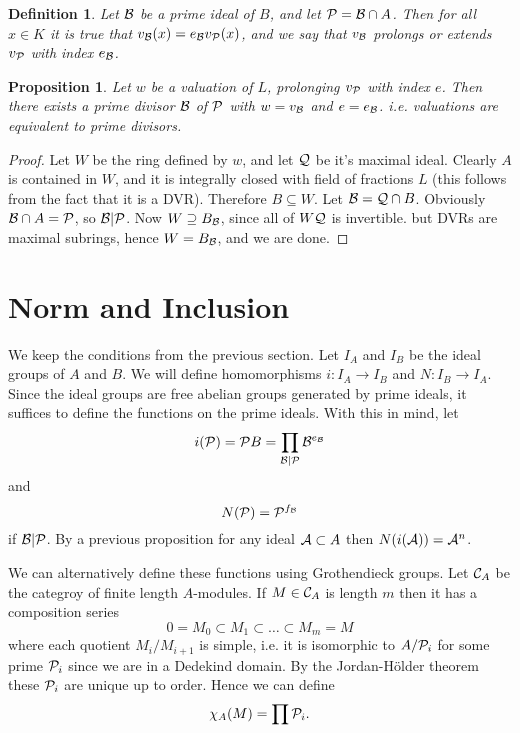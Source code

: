 \documentclass[11pt]{article} %
\newtheorem{defn}{Definition}
\newtheorem{prop}{Proposition}
\theoremstyle{remark}\newtheorem*{rem}{Remark}
\begin{document}
\begin{defn}
 Let ${\cal B}$ be a prime ideal of $B$, and let ${\cal P} = {\cal B} \cap A$.
 Then for all $x\in K$ it is true that $v_{\cal B} (x) = e_{\cal B} v_{\cal P} (x)$, and we say that $v_{\cal B}$ prolongs or extends $v_{\cal P}$ with index $e_{\cal B}$.
\end{defn}

\begin{prop}
 Let $w$ be a valuation of $L$, prolonging $v_{\cal P}$ with index $e$.
 Then there exists a prime divisor ${\cal B}$ of $\cal P$ with $w = v_{\cal B}$ and $e= e_{\cal B}$.
 i.e. valuations are equivalent to prime divisors.
\end{prop}
\begin{proof}
 Let $W$ be the ring defined by $w$, and let $\cal Q$ be it's maximal ideal.
 Clearly $A$ is contained in $W$, and it is integrally closed with field of fractions $L$ (this follows from the fact that it is a DVR).
 Therefore $B\subseteq W$.
 Let ${\cal B} = {\cal Q} \cap B$.
 Obviously ${\cal B} \cap A = {\cal P}$, so $\cal B | P$.
 Now $W\supseteq B_{\cal B}$, since all of $W\\ \cal Q$ is invertible.
 but DVRs are maximal subrings, hence $W= B_{\cal B}$, and we are done.
\end{proof}

\section{Norm and Inclusion}
We keep the conditions from the previous section.
Let $I_A$ and $I_B$ be the ideal groups of $A$ and $B$.
We will define homomorphisms $i:I_A\rightarrow I_B$ and $N:I_B \rightarrow I_A$.
Since the ideal groups are free abelian groups generated by prime ideals, it suffices to define the functions on the prime ideals.
With this in mind, let
\[
 i({\cal P}) = {\cal P}B = \prod_{\cal B|P} {\cal B}^{e_{\cal B}}
\]
and 
\[
 N({\cal P}) = {\cal P}^{f_{\cal B}}
\]
if $\cal B|P$.
By a previous proposition for any ideal ${\cal A}\subset A$ then $N(i({\cal A})) = {\cal A}^n$.


We can alternatively define these functions using Grothendieck groups.
Let ${\cal C}_A$ be the categroy of finite length $A$-modules. 
If $M\in {\cal C}_A$ is length $m$ then it has a composition series
\[
 0 = M_0 \subset M_1 \subset \ldots \subset M_m = M
\]
where each quotient $M_i/M_{i+1}$ is simple, i.e. it is isomorphic to $A/{\cal P}_i$ for some prime ${\cal P}_i$ since we are in a Dedekind domain.
By the Jordan-H{\" o}lder theorem these ${\cal P}_i$ are unique up to order.
Hence we can define
\[
 \chi_A(M) = \prod {\cal P}_i.
\]
\end{document}
